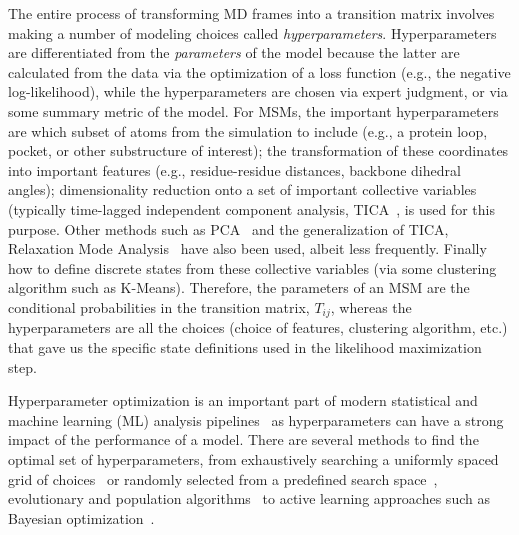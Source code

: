 \documentclass[journal=jacsat,manuscript=article]{achemso}
\begin{document}
The entire process of transforming MD frames into a transition matrix involves making a number of modeling choices called \emph{hyperparameters}. Hyperparameters are differentiated from the \emph{parameters} of the model because the latter are calculated from the data via the optimization of a loss function (e.g., the negative log-likelihood), while the hyperparameters are chosen via expert judgment, or via some summary metric of the model\cite{feurer2019hyperparameter}. 
For MSMs, the important hyperparameters~\cite{Optimized_2016, scherer_variational_2019, husic_markov_2018} are which subset of atoms from the simulation to include (e.g., a protein loop, pocket, or other substructure of interest); the transformation of these coordinates into important features (e.g., residue-residue distances, backbone dihedral angles); dimensionality reduction onto a set of important collective variables (typically time-lagged independent component analysis, TICA~\cite{perez-hernandezIdentificationSlowMolecular2013a}, is used for this purpose. Other methods such as PCA~\cite{nagelSelectingFeaturesMarkov2023} and the generalization of TICA, Relaxation Mode Analysis~\cite{mitsutakeRelaxationModeAnalysis2018} have also been used, albeit less frequently.  Finally how to define discrete states from these collective variables (via some clustering algorithm such as K-Means). Therefore, the parameters of an MSM are the conditional probabilities in the transition matrix, $T_{ij}$, whereas the hyperparameters are all the choices (choice of features, clustering algorithm, etc.) that gave us the specific state definitions used in the likelihood maximization step.   

Hyperparameter optimization is an important part of modern statistical and machine learning (ML) analysis pipelines~\cite{feurer2019hyperparameter, bergstra_jamesbergstra_random_2012, bergstra_making_2013, bergstraAlgorithmsHyperParameterOptimizationa} as hyperparameters can have a strong impact of the performance of a model. There are several methods to find the optimal set of hyperparameters, from exhaustively searching a uniformly spaced grid of choices~\cite{c1997montgomery} or randomly selected from a predefined search space~\cite{bergstra_jamesbergstra_random_2012}, evolutionary and population algorithms~\cite{simon2013evolutionary, kennedyParticleSwarmOptimization1995, eberhart1998comparison, hansenCMAEvolutionStrategy2016} to active learning approaches such as Bayesian optimization~\cite{hutterSequentialModelbasedOptimization2011, bergstraAlgorithmsHyperParameterOptimizationa, NIPS2012_4522, bergstraMakingScienceModel2013}.
\end{document}
